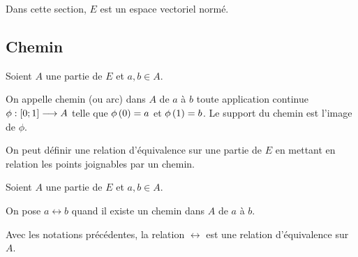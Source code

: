 Dans cette section, \(E\) est un espace vectoriel normé.

\subsection{Chemin}

\begin{defi}
Soient \(A\) une partie de \(E\) et \(a,b\in A\).

On appelle chemin (ou arc) dans \(A\) de \(a\) à \(b\) toute application continue \(\phi:\left[0;1\right]\longrightarrow A\) telle que \(\phi\left(0\right)=a\) et \(\phi\left(1\right)=b\). Le support du chemin est l'image de \(\phi\).
\end{defi}

On peut définir une relation d'équivalence sur une partie de \(E\) en mettant en relation les points joignables par un chemin.

\begin{defi}
Soient \(A\) une partie de \(E\) et \(a,b\in A\).

On pose \(a\rel b\) quand il existe un chemin dans \(A\) de \(a\) à \(b\).
\end{defi}

\begin{prop}
Avec les notations précédentes, la relation \(\rel\) est une relation d'équivalence sur \(A\).
\end{prop}

